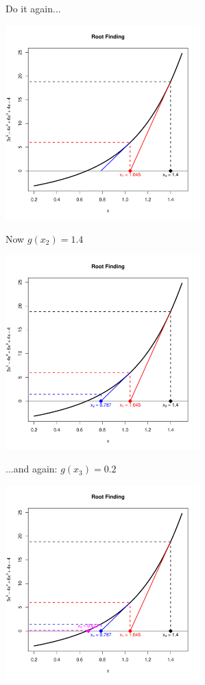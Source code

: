 \documentclass[10pt]{beamer}
\begin{document}
\begin{frame}{Do it again...}
  \begin{center}
    \includegraphics[height=7.5cm]{RCode/rf5.pdf}
  \end{center}
\end{frame}
\begin{frame}{Now $g(x_2)=1.4$}
  \begin{center}
    \includegraphics[height=7.5cm]{RCode/rf6.pdf}
  \end{center}
\end{frame}
\begin{frame}{...and again: $g(x_3)=0.2$}
  \begin{center}
    \includegraphics[height=7.5cm]{RCode/rf7.pdf}
  \end{center}
\end{frame}
\end{document}
